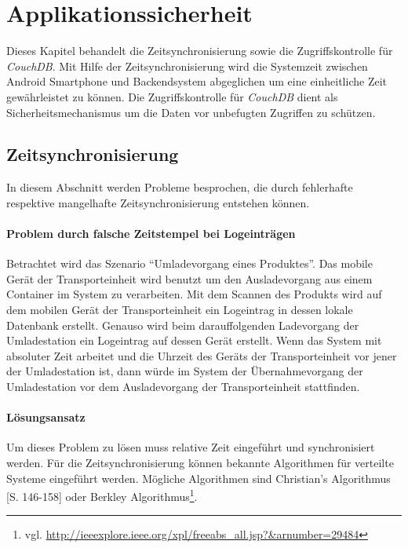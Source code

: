 \section{Applikationssicherheit}
\label{sec:security}

Dieses Kapitel behandelt die Zeitsynchronisierung sowie die Zugriffskontrolle für \emph{CouchDB}. Mit Hilfe der Zeitsynchronisierung wird 
die Systemzeit zwischen Android Smartphone und Backendsystem abgeglichen um eine einheitliche Zeit gewährleistet zu können. 
Die Zugriffskontrolle für \emph{CouchDB} dient als Sicherheitsmechanismus um die Daten vor unbefugten Zugriffen zu schützen.

\subsection{Zeitsynchronisierung}
\label{subsec:timesync}

In diesem Abschnitt werden Probleme besprochen, die durch fehlerhafte respektive
	mangelhafte Zeitsynchronisierung entstehen können.

\paragraph{Problem durch falsche Zeitstempel bei Logeinträgen} Betrachtet wird das
	Szenario ``Umladevorgang eines Produktes''. Das mobile Gerät der Transporteinheit
	wird benutzt um den Ausladevorgang aus einem Container im System zu verarbeiten.
	Mit dem Scannen des Produkts wird auf dem mobilen Gerät der Transporteinheit ein
	Logeintrag in dessen lokale Datenbank erstellt. Genauso wird beim darauffolgenden 
	Ladevorgang der Umladestation ein Logeintrag auf dessen Gerät erstellt. Wenn das
	System mit absoluter Zeit arbeitet und die Uhrzeit des Geräts der Transporteinheit
	vor jener der Umladestation ist, dann würde im System der Übernahmevorgang der
	Umladestation vor dem Ausladevorgang der Transporteinheit stattfinden.


\paragraph{Lösungsansatz} Um dieses Problem zu lösen muss relative Zeit eingeführt und
	synchronisiert werden. Für die Zeitsynchronisierung können bekannte Algorithmen
	für verteilte Systeme eingeführt werden. Mögliche Algorithmen sind Christian's
	Algorithmus \cite{Christian89}[S. 146-158] oder Berkley Algorithmus\footnote{vgl.
	\url{http://ieeexplore.ieee.org/xpl/freeabs_all.jsp?&arnumber=29484}}.

